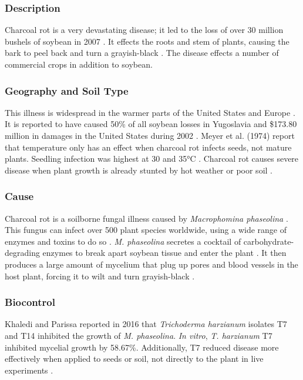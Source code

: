 \documentclass[12pt]{article}
\begin{document}
\subsubsection{Description}

Charcoal rot is a very devastating disease; it led to the loss of over 30 million bushels of soybean in 2007 \autocite{wrather2009effects}. It effects the roots and stem of plants, causing the bark to peel back and turn a grayish-black \autocite{dunleavy1966soybean}. The disease effects a number of commercial crops in addition to soybean.

\subsubsection{Geography and Soil Type}

This illness is widespread in the warmer parts of the United States and Europe \autocite{dunleavy1966soybean}. It is reported to have caused 50\% of all soybean losses in Yugoslavia \autocite{acimovic1963sclerotium} and \$173.80 million in damages in the United States during 2002 \autocite{islam2012tools}. Meyer et al. (1974) report that temperature only has an effect when charcoal rot infects seeds, not mature plants. Seedling infection was highest at 30 and 35°C \autocite{meyer1974factors}. Charcoal rot causes severe disease when plant growth is already stunted by hot weather or poor soil \autocite{dunleavy1966soybean}.

\subsubsection{Cause}

Charcoal rot is a soilborne fungal illness caused by \emph{Macrophomina phaseolina} \autocite{dunleavy1966soybean}. This fungus can infect over 500 plant species worldwide, using a wide range of enzymes and toxins to do so \autocite{islam2012tools}. \emph{M. phaseolina} secretes a cocktail of carbohydrate-degrading enzymes to break apart soybean tissue and enter the plant \autocite{islam2012tools}. It then produces a large amount of mycelium that plug up pores and blood vessels in the host plant, forcing it to wilt and turn grayish-black \autocite{islam2012tools}.

\subsubsection{Biocontrol}

Khaledi and Parissa reported in 2016 that \emph{Trichoderma harzianum} isolates T7 and T14 inhibited the growth of \emph{M. phaseolina}. \emph{In vitro}, \emph{T. harzianum} T7 inhibited mycelial growth by 58.67\%. Additionally, T7 reduced disease more effectively when applied to seeds or soil, not directly to the plant in live experiments \autocite{khaledi2016biocontrol}.
\end{document}
